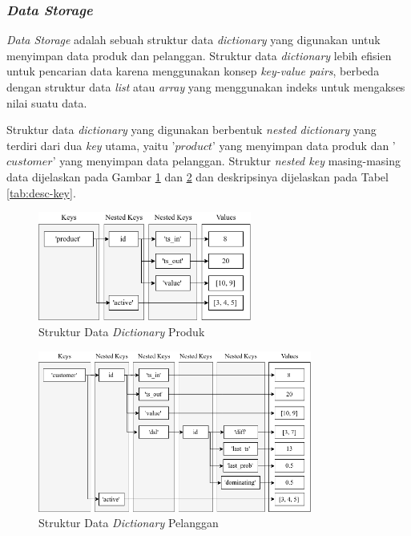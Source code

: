 \subsubsection{\textit{Data Storage}}
\tab \textit{Data Storage} adalah sebuah struktur data \textit{dictionary} yang digunakan untuk menyimpan data produk dan pelanggan. Struktur data \textit{dictionary} lebih efisien untuk pencarian data karena menggunakan konsep \textit{key-value pairs}, berbeda dengan struktur data \textit{list} atau \textit{array} yang menggunakan indeks untuk mengakses nilai suatu data.

Struktur data \textit{dictionary} yang digunakan berbentuk \textit{nested dictionary} yang terdiri dari dua \textit{key} utama, yaitu '$product$' yang menyimpan data produk dan '$customer$' yang menyimpan data pelanggan. Struktur \textit{nested key} masing-masing data dijelaskan pada Gambar \ref{fig:sd1} dan \ref{fig:sd2} dan deskripsinya dijelaskan pada Tabel \ref{tab:desc-key}.

\begin{figure}[H]
	\centering
	\includegraphics[width=7cm]{assets/img/bab3/sd1.png}
	\caption{Struktur Data \textit{Dictionary} Produk}
	\label{fig:sd1}
\end{figure}

\begin{figure}[H]
	\centering
	\includegraphics[width=9cm]{assets/img/bab3/sd2.png}
	\caption{Struktur Data \textit{Dictionary} Pelanggan}
	\label{fig:sd2}
\end{figure}

